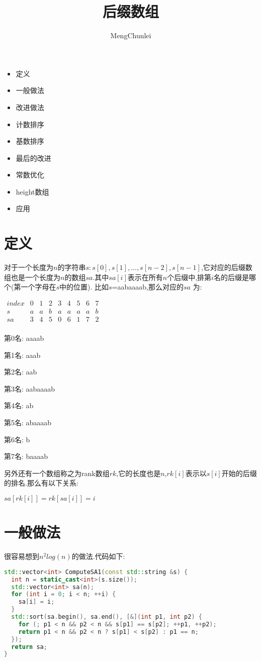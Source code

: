 \documentclass{article}
\title{后缀数组}
\author{MengChunlei}
\begin{document}
\maketitle
\begin{itemize}
	\item 定义
	\item 一般做法
	\item 改进做法
	\item 计数排序
	\item 基数排序
	\item 最后的改进
	\item 常数优化
	\item height数组
	\item 应用
\end{itemize}
\section{定义}
对于一个长度为$n$的字符串$s:s[0],s[1],...,s[n-2],s[n-1]$,它对应的后缀数组也是一个长度为$n$的数组$sa$.其中$sa[i]$表示在所有$n$个后缀中,排第$i$名的后缀是哪个(第一个字母在$s$中的位置).
比如$s$=aabaaaab,那么对应的$sa$ 为: \par
$\begin{matrix} 
index & 0 & 1 & 2 & 3 & 4 & 5 & 6 & 7 \\ 
s & a & a & b & a & a & a & a & b \\ 
sa & 3 & 4 & 5 & 0 & 6 & 1 & 7 & 2 \\
\end{matrix}$ \par
第0名: aaaab\par
第1名: aaab\par
第2名: aab\par
第3名: aabaaaab\par
第4名: ab\par
第5名: abaaaab\par
第6名: b\par
第7名: baaaab\par
另外还有一个数组称之为rank数组$rk$,它的长度也是$n$,$rk[i]$表示以$s[i]$开始的后缀的排名.那么有以下关系: \par
$sa[rk[i]]=rk[sa[i]]=i$ \par
\section{一般做法}
很容易想到$n^{2}log(n)$的做法.代码如下: \par
\begin{lstlisting}[language=C++, caption={Normal}]
std::vector<int> ComputeSA1(const std::string &s) {
  int n = static_cast<int>(s.size());
  std::vector<int> sa(n);
  for (int i = 0; i < n; ++i) {
    sa[i] = i;
  }
  std::sort(sa.begin(), sa.end(), [&](int p1, int p2) {
    for (; p1 < n && p2 < n && s[p1] == s[p2]; ++p1, ++p2);
    return p1 < n && p2 < n ? s[p1] < s[p2] : p1 == n;
  });
  return sa;
}
\end{lstlisting}
\end{document}
